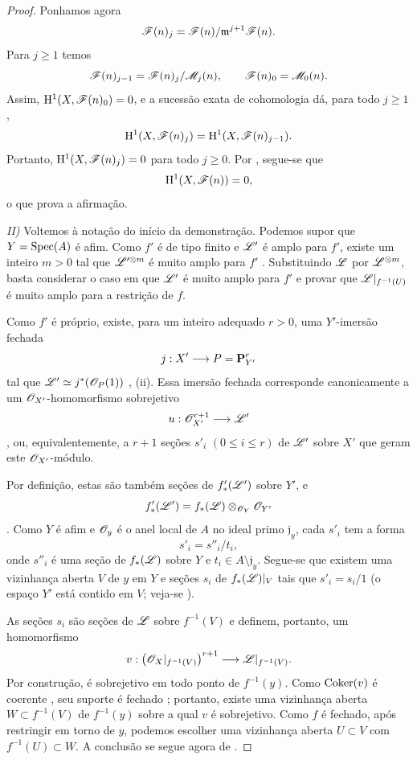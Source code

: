\begin{proof}
Ponhamos agora
\[
  \mathscr{F}(n)_j
  =
  \mathscr{F}(n)/\mathfrak m^{j+1}\mathscr{F}(n).
\]
Para $j\geq1$ temos
\[
  \mathscr{F}(n)_{j-1}
  =
  \mathscr{F}(n)_j/\mathscr{M}_j(n),
  \qquad
  \mathscr{F}(n)_0=\mathscr{M}_0(n).
\]
Assim, $\mathrm{H}^1(X,\mathscr{F}(n)_0)=0$, e a sucessão exata de cohomologia
dá, para todo $j\geq1$,
\[
  \mathrm{H}^1(X,\mathscr{F}(n)_j)
  =
  \mathrm{H}^1(X,\mathscr{F}(n)_{j-1}).
\]
Portanto, $\mathrm{H}^1(X,\mathscr{F}(n)_j)=0$ para todo $j\geq0$. Por
, segue-se que
\[
  \mathrm{H}^1(X,\mathscr{F}(n))=0,
\]
o que prova a afirmação.


\noindent\textit{II)} Voltemos à notação do início da
demonstração. Podemos supor que $Y=\operatorname{Spec}(A)$ é afim. Como
$f'$ é de tipo finito e $\mathscr{L}'$ é amplo para $f'$, existe um
inteiro $m>0$ tal que $\mathscr{L}'^{\otimes m}$ é muito amplo para
$f'$ . Substituindo $\mathscr{L}$ por
$\mathscr{L}^{\otimes m}$, basta considerar o caso em que
$\mathscr{L}'$ é muito amplo para $f'$ e provar que
$\mathscr{L}|_{f^{-1}(U)}$ é muito amplo para a restrição de $f$.

Como $f'$ é próprio, existe, para um inteiro adequado $r>0$, uma
$Y'$-imersão fechada
\[
  j:X'\longrightarrow P=\mathbf{P}_{Y'}^r
\]
tal que $\mathscr{L}'\simeq j^*(\mathscr{O}_P(1))$
, (ii). Essa imersão fechada corresponde
canonicamente a um $\mathscr{O}_{X'}$-homomorfismo sobrejetivo
\[
  u:\mathscr{O}_{X'}^{r+1}\longrightarrow\mathscr{L}'
\]
, ou, equivalentemente,  a
$r+1$ seções $s'_i$ $(0\leq i\leq r)$ de $\mathscr{L}'$ sobre $X'$
que geram este $\mathscr{O}_{X'}$-módulo.

Por definição, estas são também seções de $f'_*(\mathscr{L}')$ sobre
$Y'$, e
\[
  f'_*(\mathscr{L}')
  =
  f_*(\mathscr{L})\otimes_{\mathscr{O}_Y}\mathscr{O}_{Y'}
\]
. Como $Y$ é afim e $\mathscr{O}_y$ é o
anel local de $A$ no ideal primo $\mathfrak j_y$, cada $s'_i$
tem a forma
\[
  s'_i=s''_i/t_i,
\]
onde $s''_i$ é uma seção de $f_*(\mathscr{L})$ sobre $Y$ e
$t_i\in A\setminus\mathfrak j_y$. Segue-se que existem uma
vizinhança aberta $V$ de $y$ em $Y$ e seções $s_i$ de
$f_*(\mathscr{L})|_V$ tais que $s'_i=s_i/1$ (o espaço $Y'$ está
contido em $V$; veja-se ).

As seções $s_i$ são seções de $\mathscr{L}$ sobre $f^{-1}(V)$ e
definem, portanto, um homomorfismo
\[
  v:
  \bigl(\mathscr{O}_X|_{f^{-1}(V)}\bigr)^{r+1}
  \longrightarrow
  \mathscr{L}|_{f^{-1}(V)}.
\]
Por construção, é sobrejetivo em todo ponto de $f^{-1}(y)$.
Como $\operatorname{Coker}(v)$ é coerente , seu suporte é
fechado ; portanto, existe uma vizinhança aberta
$W\subset f^{-1}(V)$ de $f^{-1}(y)$ sobre a qual $v$ é sobrejetivo.
Como $f$ é fechado, após restringir em torno de $y$, podemos escolher uma
vizinhança aberta $U\subset V$ com $f^{-1}(U)\subset W$.
A conclusão se segue agora de .
\end{proof}


